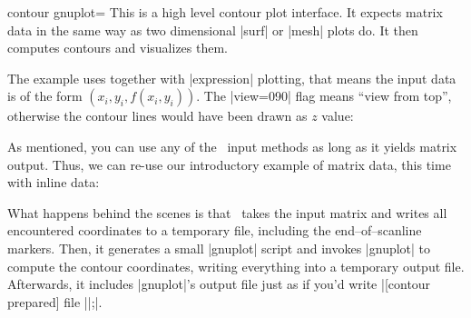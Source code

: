 {{\begin{plottype}[/pgfplots]{contour gnuplot=\textcolor{black}{}}
	This is a high level contour plot interface. It expects matrix data in the same way as two dimensional |surf| or |mesh| plots do. It then computes contours and visualizes them.
\pgfplotsexpensiveexample
\begin{codeexample}[]
\end{codeexample}
	\noindent The example uses  together with |expression| plotting, that means the input data is of the form $(x_i,y_i,f(x_i,y_i))$. The |view={0}{90}| flag means ``view from top'', otherwise the contour lines would have been drawn as $z$ value:
\pgfplotsexpensiveexample
\begin{codeexample}[]
\end{codeexample}

As mentioned, you can use any of the \PGFPlots\ input methods as long as it yields matrix output. Thus, we can re-use our introductory example of matrix data, this time with inline data:
\pgfplotsexpensiveexample
\begin{codeexample}[]%
%
\end{codeexample}
	\noindent 

	What happens behind the scenes is that \PGFPlots\ takes the input matrix and writes all encountered coordinates to a temporary file, including the end--of--scanline markers. Then, it generates a small |gnuplot| script and invokes |gnuplot| to compute the contour coordinates, writing everything into a temporary output file. Afterwards, it includes |gnuplot|'s output file just as if you'd write |[contour prepared] file ||;|.


\end{plottype}}}
